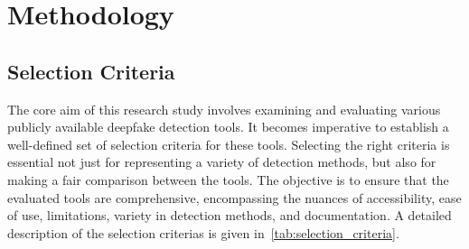 
\chapter{Methodology}\label{chapter:methodology}

\section{Selection Criteria}
The core aim of this research study involves examining and evaluating
various publicly available deepfake detection tools. It becomes imperative
to establish a well-defined set of selection criteria for these tools.
Selecting the right criteria is essential not just for representing a variety
of detection methods, but also for making a fair comparison between the tools.
The objective is to ensure that the evaluated tools are comprehensive,
encompassing the nuances of accessibility, ease of use, limitations, variety
in detection methods, and documentation. A detailed description of the selection
criterias is given in~\autoref{tab:selection_criteria}.

